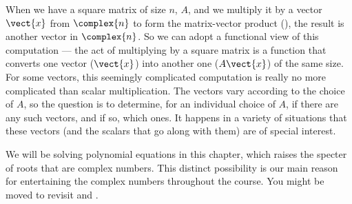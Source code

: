 When we have a square matrix of size $n$, $A$, and we multiply it by a vector $\vect{x}$ from $\complex{n}$ to form the matrix-vector product (), the result is another vector in $\complex{n}$.  So we can adopt a functional view of this computation --- the act of multiplying by a square matrix is a function that converts one vector ($\vect{x}$) into another one ($A\vect{x}$) of the same size.  For some vectors, this seemingly complicated computation is really no more complicated than scalar multiplication.  The vectors vary according to the choice of $A$, so the question is to determine, for an individual choice of $A$, if there are any such vectors, and if so, which ones.  It happens in a variety of situations that these vectors (and the scalars that go along with them) are of special interest.\par
%
We will be solving polynomial equations in this chapter, which raises the specter of roots that are complex numbers.  This distinct possibility is our main reason for entertaining the complex numbers throughout the course.  You might be moved to revisit  and .
